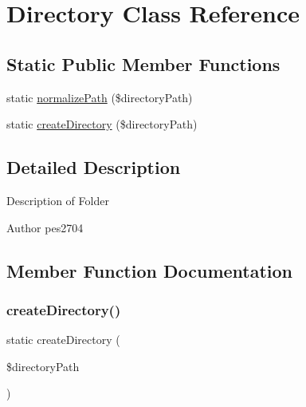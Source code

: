 \hypertarget{class_pes_1_1_utils_1_1_directory}{}\section{Directory Class Reference}
\label{class_pes_1_1_utils_1_1_directory}
\subsection*{Static Public Member Functions}
\begin{DoxyCompactItemize}
\item 
static \mbox{\hyperlink{class_pes_1_1_utils_1_1_directory_a209a82b49fda412f00ebbc45eb0df76a}{normalize\+Path}} (\$directory\+Path)
\item 
static \mbox{\hyperlink{class_pes_1_1_utils_1_1_directory_a7e9ff114e0b84dab030cf9e2f8b7b978}{create\+Directory}} (\$directory\+Path)
\end{DoxyCompactItemize}


\subsection{Detailed Description}
Description of Folder

\begin{DoxyAuthor}{Author}
pes2704 
\end{DoxyAuthor}


\subsection{Member Function Documentation}
\mbox{\label{class_pes_1_1_utils_1_1_directory_a7e9ff114e0b84dab030cf9e2f8b7b978}} 
\subsubsection{\texorpdfstring{create\+Directory()}{createDirectory()}}
{\footnotesize\ttfamily static create\+Directory (\begin{DoxyParamCaption}\item[{}]{\$directory\+Path }\end{DoxyParamCaption})\hspace{0.3cm}{\ttfamily [static]}}


